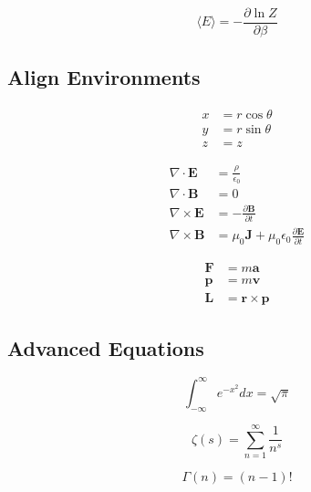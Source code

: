 \documentclass{article}
\begin{document}
\begin{equation}\label{eq:020}
\langle E \rangle = -\frac{\partial \ln Z}{\partial \beta}
\end{equation}

\subsection{Align Environments}\label{subsec:align}

\begin{align}
x &= r\cos\theta \label{eq:021}\\
y &= r\sin\theta \label{eq:022}\\
z &= z \label{eq:023}
\end{align}

\begin{align}
\nabla \cdot \mathbf{E} &= \frac{\rho}{\epsilon_0} \label{eq:024}\\
\nabla \cdot \mathbf{B} &= 0 \label{eq:025}\\
\nabla \times \mathbf{E} &= -\frac{\partial \mathbf{B}}{\partial t} \label{eq:026}\\
\nabla \times \mathbf{B} &= \mu_0\mathbf{J} + \mu_0\epsilon_0\frac{\partial \mathbf{E}}{\partial t} \label{eq:027}
\end{align}

\begin{align}
\mathbf{F} &= m\mathbf{a} \label{eq:028}\\
\mathbf{p} &= m\mathbf{v} \label{eq:029}\\
\mathbf{L} &= \mathbf{r} \times \mathbf{p} \label{eq:030}
\end{align}

\subsection{Advanced Equations}\label{subsec:advanced}

\begin{equation}\label{eq:031}
\int_{-\infty}^\infty e^{-x^2} dx = \sqrt{\pi}
\end{equation}

\begin{equation}\label{eq:032}
\zeta(s) = \sum_{n=1}^\infty \frac{1}{n^s}
\end{equation}

\begin{equation}\label{eq:033}
\Gamma(n) = (n-1)!
\end{equation}
\end{document}
